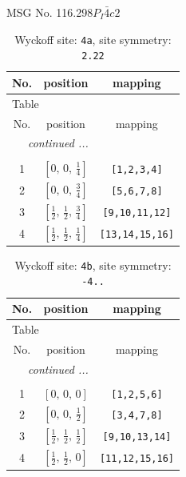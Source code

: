 \documentclass[fleqn,8pt]{jsarticle}
\begin{document}
\setcounter{MaxMatrixCols}{32}

\renewcommand{\tablename}{Table~}
\renewcommand{\figurename}{Figure~}
\begin{center}
\LARGE
MSG No. 116.298\quad$P_{I}\bar{4}c2$
\end{center}
\renewcommand{\arraystretch}{1.2}
\begin{longtable}{ccc}
\caption{Wyckoff site: {\tt 4a}, site symmetry: {\tt 2.22}}
 \\
 \hline \hline
No. & position & mapping \\ \hline \endfirsthead

\multicolumn{2}{l}{\tablename\ \thetable{}} \\
 \hline \hline
No. & position & mapping \\ \hline \endhead

 \hline \hline
\multicolumn{2}{r}{\footnotesize\it continued ...} \\ \endfoot

 \hline \hline
\multicolumn{2}{r}{} \\ \endlastfoot

1 & $\left[ 0,\, 0,\, \frac{1}{4} \right]$ & {\tt [1,2,3,4]} \\ \hline
2 & $\left[ 0,\, 0,\, \frac{3}{4} \right]$ & {\tt [5,6,7,8]} \\ \hline
3 & $\left[ \frac{1}{2},\, \frac{1}{2},\, \frac{3}{4} \right]$ & {\tt [9,10,11,12]} \\ \hline
4 & $\left[ \frac{1}{2},\, \frac{1}{2},\, \frac{1}{4} \right]$ & {\tt [13,14,15,16]} \\
\end{longtable}
\renewcommand{\arraystretch}{1.2}
\begin{longtable}{ccc}
\caption{Wyckoff site: {\tt 4b}, site symmetry: {\tt -4..}}
 \\
 \hline \hline
No. & position & mapping \\ \hline \endfirsthead

\multicolumn{2}{l}{\tablename\ \thetable{}} \\
 \hline \hline
No. & position & mapping \\ \hline \endhead

 \hline \hline
\multicolumn{2}{r}{\footnotesize\it continued ...} \\ \endfoot

 \hline \hline
\multicolumn{2}{r}{} \\ \endlastfoot

1 & $\left[ 0,\, 0,\, 0 \right]$ & {\tt [1,2,5,6]} \\ \hline
2 & $\left[ 0,\, 0,\, \frac{1}{2} \right]$ & {\tt [3,4,7,8]} \\ \hline
3 & $\left[ \frac{1}{2},\, \frac{1}{2},\, \frac{1}{2} \right]$ & {\tt [9,10,13,14]} \\ \hline
4 & $\left[ \frac{1}{2},\, \frac{1}{2},\, 0 \right]$ & {\tt [11,12,15,16]} \\
\end{longtable}
\end{document}
